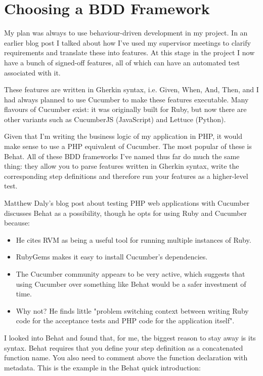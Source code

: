 \chapter{Choosing a BDD Framework} \label{appendix:bdd}

My plan was always to use behaviour-driven development in my project. In an earlier blog post I talked about how I've used my supervisor meetings to clarify requirements and translate these into features. At this stage in the project I now have a bunch of signed-off features, all of which can have an automated test associated with it.

These features are written in Gherkin syntax, i.e. Given, When, And, Then, and I had always planned to use Cucumber to make these features executable. Many flavours of Cucumber exist: it was originally built for Ruby, but now there are other variants such as CucumberJS (JavaScript) and Lettuce (Python).

Given that I'm writing the business logic of my application in PHP, it would make sense to use a PHP equivalent of Cucumber. The most popular of these is Behat. All of these BDD frameworks I've named thus far do much the same thing: they allow you to parse features written in Gherkin syntax, write the corresponding step definitions and therefore run your features as a higher-level test.

Matthew Daly's blog post about testing PHP web applications with Cucumber discusses Behat as a possibility, though he opts for using Ruby and Cucumber because:

\begin{itemize}
    \item He cites RVM as being a useful tool for running multiple instances of Ruby.

    \item RubyGems makes it easy to install Cucumber's dependencies.

    \item The Cucumber community appears to be very active, which suggests that using Cucumber over something like Behat would be a safer investment of time.

    \item Why not? He finds little "problem switching context between writing Ruby code for the acceptance tests and PHP code for the application itself".
\end{itemize}

I looked into Behat and found that, for me, the biggest reason to stay away is its syntax. Behat requires that you define your step definition as a concatenated function name. You also need to comment above the function declaration with metadata. This is the example in the Behat quick introduction:

